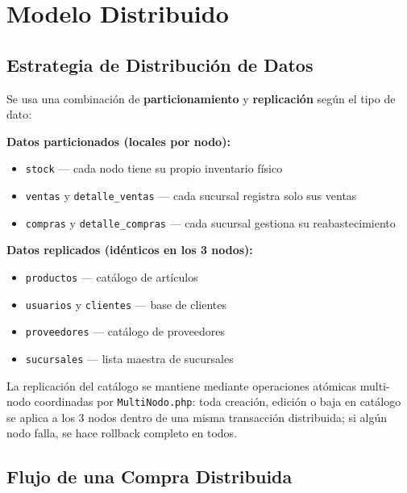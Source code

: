 \documentclass[11pt,a4paper]{article}
\newcommand{\code}[1]{\texttt{#1}}
\begin{document}
\newpage
\section{Modelo Distribuido}

\subsection{Estrategia de Distribución de Datos}

Se usa una combinación de \textbf{particionamiento} y \textbf{replicación} según el tipo de dato:

\textbf{Datos particionados (locales por nodo):}
\begin{itemize}[nosep]
    \item \code{stock} --- cada nodo tiene su propio inventario físico
    \item \code{ventas} y \code{detalle\_ventas} --- cada sucursal registra solo sus ventas
    \item \code{compras} y \code{detalle\_compras} --- cada sucursal gestiona su reabastecimiento
\end{itemize}

\textbf{Datos replicados (idénticos en los 3 nodos):}
\begin{itemize}[nosep]
    \item \code{productos} --- catálogo de artículos
    \item \code{usuarios} y \code{clientes} --- base de clientes
    \item \code{proveedores} --- catálogo de proveedores
    \item \code{sucursales} --- lista maestra de sucursales
\end{itemize}

La replicación del catálogo se mantiene mediante operaciones atómicas multi-nodo coordinadas por \code{MultiNodo.php}: toda creación, edición o baja en catálogo se aplica a los 3 nodos dentro de una misma transacción distribuida; si algún nodo falla, se hace rollback completo en todos.

\subsection{Flujo de una Compra Distribuida}
\end{document}
